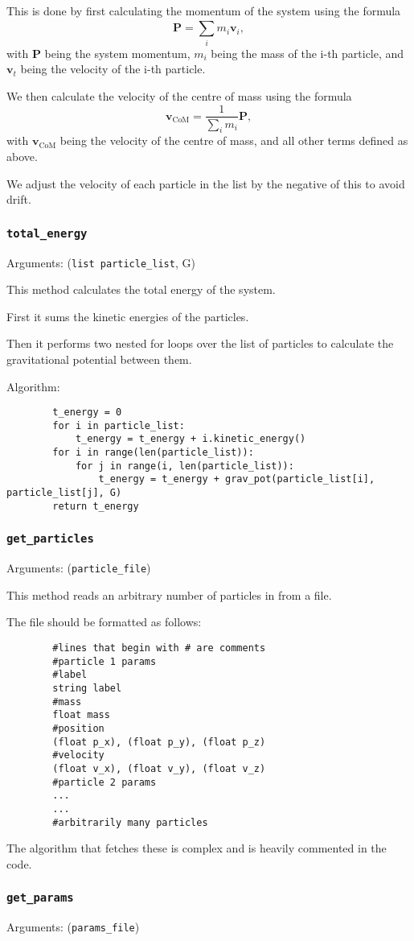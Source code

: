 \documentclass[a4paper, 11pt, british, left=1in, right=1in, top=0.3in, bottom=1in]{article}
\begin{document}
	This is done by first calculating the momentum of the system using the formula $$\textbf{P} = \sum_{i}^{}m_i\textbf{v}_i, $$ with $\textbf{P}$ being the system momentum, $m_i$ being the mass of the i-th particle, and $\textbf{v}_t$ being the velocity of the i-th particle. 
	
	We then calculate the velocity of the centre of mass using the formula $$\textbf{v}_{\text{CoM}} = \frac{1}{\sum_{i}^{}m_i}\textbf{P},$$ with $\textbf{v}_{\text{CoM}}$ being the velocity of the centre of mass, and all other terms defined as above. 
	
	We adjust the velocity of each particle in the list by the negative of this to avoid drift. 
	
	\subsubsection{\texttt{total\_energy}}
	
	Arguments: (\texttt{list particle\_list}, G)
	
	This method calculates the total energy of the system. 
	
	First it sums the kinetic energies of the particles. 
	
	Then it performs two nested for loops over the list of particles to calculate the gravitational potential between them.
	
	Algorithm:
	
	\begin{verbatim}
		t_energy = 0
		for i in particle_list:
		    t_energy = t_energy + i.kinetic_energy()
		for i in range(len(particle_list)):
		    for j in range(i, len(particle_list)):
		        t_energy = t_energy + grav_pot(particle_list[i], particle_list[j], G)
		return t_energy
	\end{verbatim}
	
	\subsubsection{\texttt{get\_particles}}
	
	Arguments: (\texttt{particle\_file})
	
	This method reads an arbitrary number of particles in from a file. 
	
	The file should be formatted as follows:
	\pagebreak
	\begin{verbatim}
		#lines that begin with # are comments
		#particle 1 params
		#label
		string label
		#mass
		float mass
		#position
		(float p_x), (float p_y), (float p_z)
		#velocity
		(float v_x), (float v_y), (float v_z)
		#particle 2 params
		...
		...
		#arbitrarily many particles
	\end{verbatim}
	
	The algorithm that fetches these is complex and is heavily commented in the code. 
	
	\subsubsection{\texttt{get\_params}}
	
	Arguments: (\texttt{params\_file})
\end{document}
